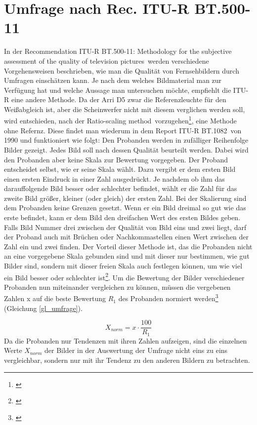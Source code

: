 \section{Umfrage nach Rec. ITU-R  BT.500-11}
\label{sec_umfrageitu}
In der \glqq Recommendation ITU-R BT.500-11: Methodology for the subjective assessment of the 
quality of television pictures\grqq\ werden verschiedene Vorgehensweisen beschrieben, wie man die Qualität von Fernsehbildern durch Umfragen einschätzen kann. Je nach dem welches Bildmaterial man zur Verfügung hat und welche Aussage man untersuchen möchte, empfiehlt die ITU-R eine andere Methode. Da der Arri D5 zwar die Referenzleuchte für den Weißabgleich ist, aber die Scheinwerfer nicht mit diesem verglichen werden soll, wird entschieden, nach der \glqq Ratio-scaling method\grqq\ vorzugehen\footnote{\cite[10]{itu}}, eine Methode ohne Refernz. Diese findet man wiederum in dem \glqq Report ITU-R BT.1082\grqq\ von 1990 und funktioniert wie folgt:
Den Probanden werden in zufälliger Reihenfolge Bilder gezeigt. Jedes  Bild soll nach dessen Qualität beurteilt werden. Dabei wird den Probanden aber keine Skala zur Bewertung vorgegeben. Der Proband entscheidet selbst, wie er seine Skala wählt. Dazu vergibt er dem ersten Bild einen ersten Eindruck in einer Zahl ausgedrückt. Je nachdem ob ihm das darauffolgende Bild besser oder schlechter befindet, wählt er die Zahl für das zweite Bild größer, kleiner (oder gleich) der ersten Zahl. Bei der Skalierung sind dem Probanden keine Grenzen gesetzt. Wenn er ein Bild dreimal so gut wie das erste befindet, kann er dem Bild den dreifachen Wert des ersten Bildes geben. Falls Bild Nummer drei zwischen der Qualität von Bild eins und zwei liegt, darf der Proband auch mit Brüchen oder Nachkommastellen einen Wert zwischen der Zahl ein und zwei finden. Der Vorteil dieser Methode ist, das die Probanden nicht an eine vorgegebene Skala gebunden sind und mit dieser nur bestimmen, wie gut Bilder sind, sondern mit dieser freien Skala auch festlegen können, um wie viel ein Bild besser oder schlechter ist\footnote{\cite[385]{itu90}}. Um die Bewertung der Bilder verschiedener Probanden nun miteinander vergleichen zu können, müssen die vergebenen Zahlen x auf die beste Bewertung $R_{1}$ des Probanden normiert werden\footnote{\cite[387]{itu90}} (Gleichung \ref{gl_umfrage}).

\begin{equation}\label{gl_umfrage}
		X_{norm} = x \cdot \frac{100}{R_{1}}
\end{equation}
Da die Probanden nur Tendenzen mit ihren Zahlen aufzeigen, sind die einzelnen Werte $X_{norm}$ der Bilder in der Auswertung der Umfrage nicht eins zu eins vergleichbar, sondern nur mit ihr Tendenz zu den anderen Bildern zu betrachten.

